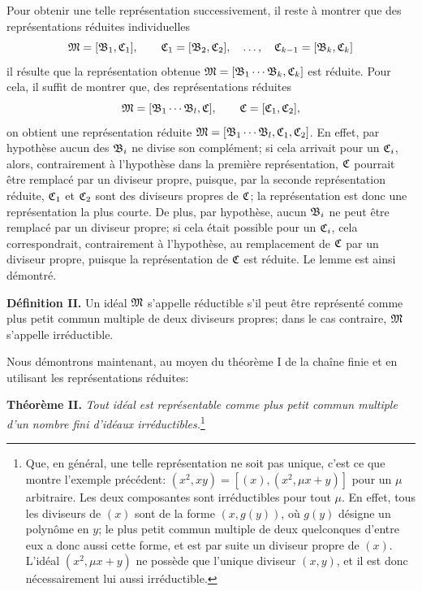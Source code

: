 Pour obtenir une telle représentation successivement, il reste à montrer que des représentations réduites individuelles
\[
 \mathfrak{M}=[\mathfrak{B}_1,\mathfrak{C}_1],\qquad
 \mathfrak{C}_1=[\mathfrak{B}_2,\mathfrak{C}_2],\quad\ldots,\quad
 \mathfrak{C}_{k-1}=[\mathfrak{B}_k,\mathfrak{C}_k]
\]
il résulte que la représentation obtenue $\mathfrak{M}=[\mathfrak{B}_1\cdots\mathfrak{B}_k,\mathfrak{C}_k]$ est réduite. Pour cela, il suffit de montrer que, des représentations réduites
\[
 \mathfrak{M}=[\mathfrak{B}_1\cdots\mathfrak{B}_l,\mathfrak{C}],\qquad \mathfrak{C}=[\mathfrak{C}_1,\mathfrak{C}_2],
\]
on obtient une représentation réduite $\mathfrak{M}=[\mathfrak{B}_1\cdots\mathfrak{B}_l,\mathfrak{C}_1,\mathfrak{C}_2]$. En effet, par hypothèse aucun des $\mathfrak{B}_i$ ne divise son complément; si cela arrivait pour un $\mathfrak{C}_i$, alors, contrairement à l'hypothèse dans la première représentation, $\mathfrak{C}$ pourrait être remplacé par un diviseur propre, puisque, par la seconde représentation réduite, $\mathfrak{C}_1$ et $\mathfrak{C}_2$ sont des diviseurs propres de $\mathfrak{C}$; la représentation est donc une représentation la plus courte. De plus, par hypothèse, aucun $\mathfrak{B}_i$ ne peut être remplacé par un diviseur propre; si cela était possible pour un $\mathfrak{C}_i$, cela correspondrait, contrairement à l'hypothèse, au remplacement de $\mathfrak{C}$ par un diviseur propre, puisque la représentation de $\mathfrak{C}$ est réduite. Le lemme est ainsi démontré.

\textbf{Définition II.} Un idéal $\mathfrak{M}$ s'appelle réductible s'il peut être représenté comme plus petit commun multiple de deux diviseurs propres; dans le cas contraire, $\mathfrak{M}$ s'appelle irréductible.

Nous démontrons maintenant, au moyen du théorème I de la chaîne finie et en utilisant les représentations réduites:

\textbf{Théorème II.} \emph{Tout idéal est représentable comme plus petit commun multiple d'un nombre fini d'idéaux irréductibles.}\footnote{Que, en général, une telle représentation ne soit pas unique, c'est ce que montre l'exemple précédent: $(x^2,xy)=[(x),(x^2,\mu x+y)]$ pour un $\mu$ arbitraire. Les deux composantes sont irréductibles pour tout $\mu$. En effet, tous les diviseurs de $(x)$ sont de la forme $(x,g(y))$, où $g(y)$ désigne un polynôme en $y$; le plus petit commun multiple de deux quelconques d'entre eux a donc aussi cette forme, et est par suite un diviseur propre de $(x)$. L'idéal $(x^2,\mu x+y)$ ne possède que l'unique diviseur $(x,y)$, et il est donc nécessairement lui aussi irréductible.}

